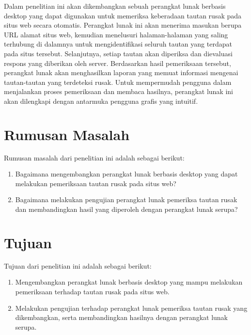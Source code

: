 \documentclass[a4paper,twoside]{article}
\begin{document}
Dalam penelitian ini akan dikembangkan sebuah perangkat lunak berbasis desktop yang dapat digunakan untuk memeriksa keberadaan tautan rusak pada situs web secara otomatis. Perangkat lunak ini akan menerima masukan berupa URL alamat situs web, kemudian menelusuri halaman-halaman yang saling terhubung di dalamnya untuk mengidentifikasi seluruh tautan yang terdapat pada situs tersebut. Selanjutnya, setiap tautan akan diperiksa dan dievaluasi respons yang diberikan oleh server. Berdasarkan hasil pemeriksaan tersebut, perangkat lunak akan menghasilkan laporan yang memuat informasi mengenai tautan-tautan yang terdeteksi rusak. Untuk mempermudah pengguna dalam menjalankan proses pemeriksaan dan membaca hasilnya, perangkat lunak ini akan dilengkapi dengan antarmuka pengguna grafis yang intuitif.

\vspace{5pt}

\section{Rumusan Masalah}
Rumusan masalah dari penelitian ini adalah sebagai berikut:
\begin{enumerate}
    \setlength\itemsep{1pt}

    \item Bagaimana mengembangkan perangkat lunak berbasis desktop yang dapat melakukan pemeriksaan tautan rusak pada situs web?
    
    \item Bagaimana melakukan pengujian perangkat lunak pemeriksa tautan rusak dan membandingkan hasil yang diperoleh dengan perangkat lunak serupa?
    
\end{enumerate}


\section{Tujuan}
Tujuan dari penelitian ini adalah sebagai berikut:

\begin{enumerate}

    \item Mengembangkan perangkat lunak berbasis desktop yang mampu melakukan pemeriksaan terhadap tautan rusak pada situs web.
    
    \item Melakukan pengujian terhadap perangkat lunak pemeriksa tautan rusak yang dikembangkan, serta membandingkan hasilnya dengan perangkat lunak serupa.
    
\end{enumerate}
\end{document}
